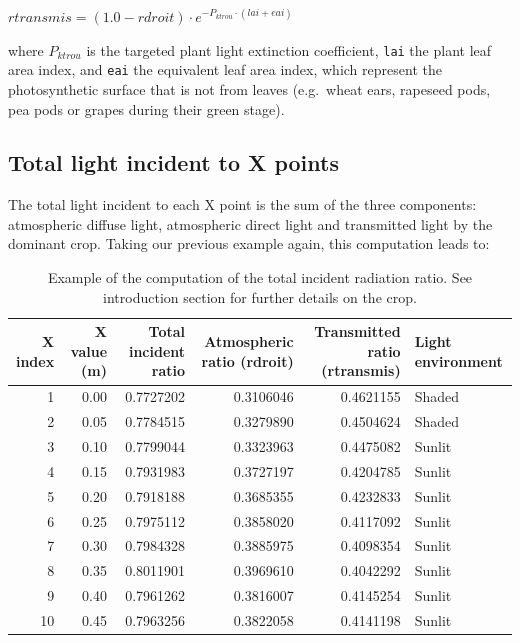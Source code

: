 \documentclass[]{book}
\begin{document}
\(rtransmis=(1.0-rdroit)\cdot e^{-P_{ktrou}\cdot(lai+eai)}\)

where \(P_{ktrou}\) is the targeted plant light extinction coefficient, \texttt{lai} the plant leaf area index, and \texttt{eai} the equivalent leaf area index, which represent the photosynthetic surface that is not from leaves (e.g.~wheat ears, rapeseed pods, pea pods or grapes during their green stage).

\hypertarget{total-light-incident-to-x-points}{%
\subsection{Total light incident to X points}\label{total-light-incident-to-x-points}}

The total light incident to each X point is the sum of the three components: atmospheric diffuse light, atmospheric direct light and transmitted light by the dominant crop.
Taking our previous example again, this computation leads to:

\begin{table}[t]

\caption{\label{tab:unnamed-chunk-5}Example of the computation of the total incident radiation ratio. See introduction section for further details on the crop.}
\centering
\begin{tabular}{r|r|r|r|r|l}
\hline
X index & X value (m) & Total incident ratio & Atmospheric ratio (rdroit) & Transmitted ratio (rtransmis) & Light environment\\
\hline
1 & 0.00 & 0.7727202 & 0.3106046 & 0.4621155 & Shaded\\
\hline
2 & 0.05 & 0.7784515 & 0.3279890 & 0.4504624 & Shaded\\
\hline
3 & 0.10 & 0.7799044 & 0.3323963 & 0.4475082 & Sunlit\\
\hline
4 & 0.15 & 0.7931983 & 0.3727197 & 0.4204785 & Sunlit\\
\hline
5 & 0.20 & 0.7918188 & 0.3685355 & 0.4232833 & Sunlit\\
\hline
6 & 0.25 & 0.7975112 & 0.3858020 & 0.4117092 & Sunlit\\
\hline
7 & 0.30 & 0.7984328 & 0.3885975 & 0.4098354 & Sunlit\\
\hline
8 & 0.35 & 0.8011901 & 0.3969610 & 0.4042292 & Sunlit\\
\hline
9 & 0.40 & 0.7961262 & 0.3816007 & 0.4145254 & Sunlit\\
\hline
10 & 0.45 & 0.7963256 & 0.3822058 & 0.4141198 & Sunlit\\
\hline
\end{tabular}
\end{table}
\end{document}

